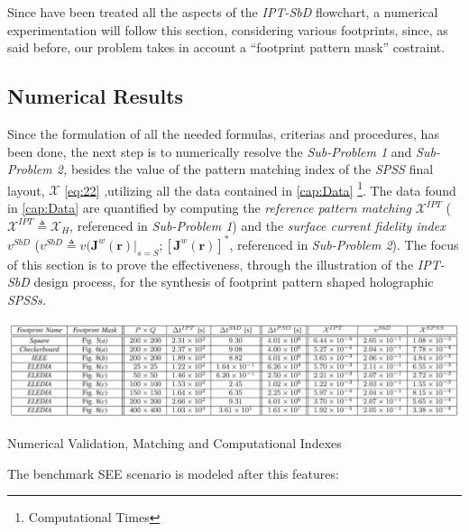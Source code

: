 Since have been treated all the aspects of the \emph{IPT-SbD} flowchart,
a numerical experimentation will follow this section, considering
various footprints, since, as said before, our problem takes in account
a {}``footprint pattern mask'' costraint.
\subsection{Numerical Results\label{sub:Numerical-Results}}

Since the formulation of all the needed formulas, criterias and procedures,
has been done, the next step is to numerically resolve the \emph{Sub-Problem
1} and \emph{Sub-Problem 2,} besides the value of the pattern matching
index of the \emph{SPSS} final layout, $\mathcal{X}$ \ref{eq:22}
\emph{},utilizing all the data contained in \ref{cap:Data}%
\footnote{Computational Times%
}{\let\thefootnote\relax{}}.
The data found in \ref{cap:Data} are quantified by computing the
\emph{reference pattern matching} $\mathcal{X}^{IPT}$ ($\mathcal{X}^{IPT}\triangleq\mathcal{X}_{H}$,
referenced in \emph{Sub-Problem 1}) and the \emph{surface current
fidelity index $v^{SbD}$} ($v^{SbD}\triangleq v(\mathbf{J}^{w}(\mathbf{r})|_{s=S};[\mathbf{J}^{w}(\mathbf{r})]^{*}$,
referenced in \emph{Sub-Problem 2}). The focus of this section is
to prove the effectiveness, through the illustration of the \emph{IPT-SbD}
design process, for the synthesis of footprint pattern shaped holographic
\emph{SPSSs. }

\begin{center}%
\begin{table}[H]
\begin{center}\includegraphics[scale=0.5]{./Figure/FIgure03.png}\end{center}
\caption{\footnotesize\label{cap:Data}Numerical Validation, Matching and Computational
Indexes }
\end{table}
\end{center}

The benchmark SEE scenario is modeled after this features:

